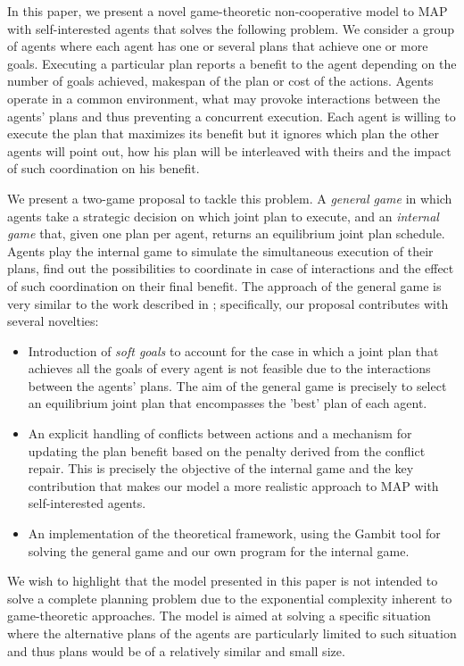 \documentclass[letterpaper]{article}
\begin{document}
In this paper, we present a novel game-theoretic non-cooperative model to MAP with self-interested agents that solves the following problem. We consider a group of agents where each agent has one or several plans that achieve one or more goals. Executing a particular plan reports a benefit to the agent depending on the number of goals achieved, makespan of the plan or cost of the actions. Agents operate in a common environment, what may provoke interactions between the agents' plans and thus preventing a concurrent execution. Each agent is willing to execute the plan that maximizes its benefit but it ignores which plan the other agents will point out, how his plan will be interleaved with theirs and the impact of such coordination on his benefit.

We present a two-game proposal to tackle this problem. A \emph{general game} in which agents take a strategic decision on which joint plan to execute, and an \emph{internal game} that, given one plan per agent, returns an equilibrium joint plan schedule. Agents play the internal game to simulate the simultaneous execution of their plans, find out the possibilities to coordinate in case of interactions and the effect of such coordination on their final benefit. The approach of the general game is very similar to
the work described in \cite{LarbiKM07}; specifically, our proposal contributes with several novelties:

\begin{itemize}
\item Introduction of \emph{soft goals} to account for the case in which a joint plan that achieves all the goals of every agent is not feasible due to the interactions between the agents' plans. The aim of the general game is precisely to select an equilibrium joint plan that encompasses the 'best' plan of each agent.
\item  An explicit handling of conflicts between actions and a mechanism for updating the plan benefit based on the penalty derived from the conflict repair. This is precisely the objective of the internal game and the key contribution that makes our model a more realistic approach to MAP with self-interested agents.
\item An implementation of the theoretical framework, using the Gambit tool \cite{Gambit} for solving the general game and our own program for the internal game.
\end{itemize}

We wish to highlight that the model presented in this paper is not intended to solve a complete planning problem due to the exponential complexity inherent to game-theoretic approaches. The model is aimed at solving a specific situation where the alternative plans of the agents are particularly limited to such situation and thus plans would be of a relatively similar and small size.
\end{document}
